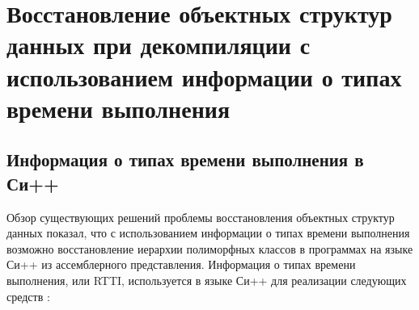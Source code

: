 \newpage
\section{Восстановление объектных структур данных при декомпиляции с использованием информации о типах времени выполнения}\label{chapter:reconstruction_with_rtti}

\subsection{Информация о типах времени выполнения в Си++}\label{chapter:rtti_in_cpp}
Обзор существующих решений проблемы восстановления объектных структур данных показал, что с использованием информации о типах времени выполнения возможно восстановление иерархии полиморфных классов в программах на языке Си++ из ассемблерного представления. Информация о типах времени выполнения, или RTTI, используется в языке Си++ для реализации следующих средств \cite{cpp03}:

